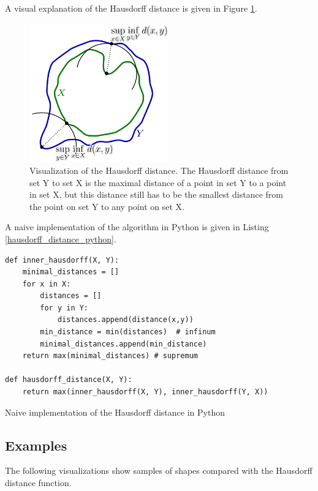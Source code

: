 A visual explanation of the Hausdorff distance is given in Figure \ref{hausdorff_distance}.

\begin{figure}[H]
\centering
\includegraphics[width=6cm]{chapters/06_hdm/images/hausdorff_distance.png}
\caption{Visualization of the Hausdorff distance. The Hausdorff distance from set Y to set X is the maximal distance of a point in set Y to a point in set X, but this distance still has to be the smallest distance from the point on set Y to any point on set X.\cite{hausdorffdistanceimage}}
\label{hausdorff_distance}
\end{figure}

A naive implementation of the algorithm in Python is given in Listing \ref{hausdorff_distance_python}.

\begin{listing}[H]
\begin{verbatim}
def inner_hausdorff(X, Y):
    minimal_distances = []
    for x in X:
        distances = []
        for y in Y:
            distances.append(distance(x,y))
        min_distance = min(distances)  # infinum
        minimal_distances.append(min_distance)
    return max(minimal_distances) # supremum

def hausdorff_distance(X, Y):
    return max(inner_hausdorff(X, Y), inner_hausdorff(Y, X))
\end{verbatim}
\caption{Naive implementation of the Hausdorff distance in Python}
\label{hausdorff_distance_python}
\end{listing}

\subsection{Examples}
The following visualizations show samples of shapes compared with the Hausdorff distance function.


